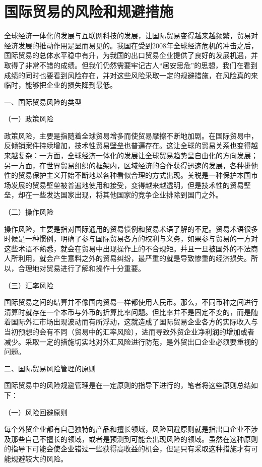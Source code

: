 \chapter{国际贸易的风险和规避措施}
全球经济一体化的发展与互联网科技的发展，让国际贸易变得越来越频繁，贸易对经济发展的推动作用是显而易见的。我国在受到2008年全球经济危机的冲击之后，国际贸易的总体水平稳中有升，为我国的出口贸易企业提供了良好的发展机遇，并取得了非常不错的成绩。但我们仍然需要牢记古人“居安思危”的思想，我们在看到成绩的同时也要看到风险存在，并对这些风险采取一定的规避措施，在风险真的来临时，能够把企业的损失降到最低。

一、国际贸易风险的类型

（一）政策风险

政策风险，主要是指随着全球贸易增多而使贸易摩擦不断地加剧。在国际贸易中，反倾销案件持续增加，技术性贸易壁垒也普遍存在。这让全球的贸易关系也变得越来越复杂：一方面，全球经济一体化的发展让全球贸易趋势呈自由化的方向发展；另一方面，在世界贸易组织的框架内，区域经济的合作获得迅速的发展，各种排他性的贸易保护主义开始不断地以各种看似合理的方式出现。关税是一种保护本国市场发展的贸易壁垒被普遍地使用和接受，变得越来越透明，但是技术性的贸易壁垒，却在一些发达国家出现，将其他国家的竞争企业排除到国门之外。

（二）操作风险

操作风险，主要是指对国际通用的贸易惯例和贸易术语了解的不足。贸易术语很多时候是一种惯例，明确了参与国际贸易各方的权利与义务，如果参与贸易的一方对这些术语不熟悉，就会在贸易中出现操作上的不合规矩。并且一旦被国外的不法商人所利用，就会产生意料之外的贸易纠纷，最严重的就是导致惨重的经济损失。所以，合理地对贸易进行了解和操作十分重要。

（三）汇率风险

国际贸易之间的结算并不像国内贸易一样都使用人民币。那么，不同币种之间进行清算时就存在一个本币与外币的折算比率问题。但比率并不是固定不变的，而是随着国际外汇市场出现波动而有所浮动，这就造成了国际贸易企业各方的实际收入与当初预想的会有不同（贸易中的汇率风险），进而导致外贸企业净利润的增加或者减少。采取一定的措施切实地对外汇风险进行防范，是外贸出口企业必须要重视的问题。

二、国际贸易风险管理的原则

国际贸易中的风险规避管理是在一定原则的指导下进行的，笔者将这些原则总结如下：

（一）风险回避原则

每个外贸企业都有自己独特的产品和擅长领域，风险回避原则就是指出口企业不涉及那些自己不擅长的领域，或者是预测到可能会出现风险的领域。虽然在这种原则的指导下可能会使企业错过一些获得高收益的机会，但是只有采取这种措施才有可能规避较大的风险。

